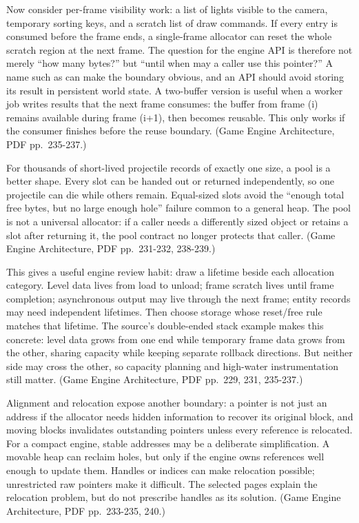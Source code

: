 Now consider per-frame visibility work: a list of lights visible to the camera, temporary sorting keys, and a scratch list of draw commands. If every entry is consumed before the frame ends, a single-frame allocator can reset the whole scratch region at the next frame. The question for the engine API is therefore not merely ``how many bytes?'' but ``until when may a caller use this pointer?'' A name such as  can make the boundary obvious, and an API should avoid storing its result in persistent world state. A two-buffer version is useful when a worker job writes results that the next frame consumes: the buffer from frame (i) remains available during frame (i+1), then becomes reusable. This only works if the consumer finishes before the reuse boundary. (Game Engine Architecture, PDF pp.~235-237.)

For thousands of short-lived projectile records of exactly one size, a pool is a better shape. Every slot can be handed out or returned independently, so one projectile can die while others remain. Equal-sized slots avoid the ``enough total free bytes, but no large enough hole'' failure common to a general heap. The pool is not a universal allocator: if a caller needs a differently sized object or retains a slot after returning it, the pool contract no longer protects that caller. (Game Engine Architecture, PDF pp.~231-232, 238-239.)

This gives a useful engine review habit: draw a lifetime beside each allocation category. Level data lives from load to unload; frame scratch lives until frame completion; asynchronous output may live through the next frame; entity records may need independent lifetimes. Then choose storage whose reset/free rule matches that lifetime. The source's double-ended stack example makes this concrete: level data grows from one end while temporary frame data grows from the other, sharing capacity while keeping separate rollback directions. But neither side may cross the other, so capacity planning and high-water instrumentation still matter. (Game Engine Architecture, PDF pp.~229, 231, 235-237.)

Alignment and relocation expose another boundary: a pointer is not just an address if the allocator needs hidden information to recover its original block, and moving blocks invalidates outstanding pointers unless every reference is relocated. For a compact engine, stable addresses may be a deliberate simplification. A movable heap can reclaim holes, but only if the engine owns references well enough to update them. Handles or indices can make relocation possible; unrestricted raw pointers make it difficult. The selected pages explain the relocation problem, but do not prescribe handles as its solution. (Game Engine Architecture, PDF pp.~233-235, 240.)

